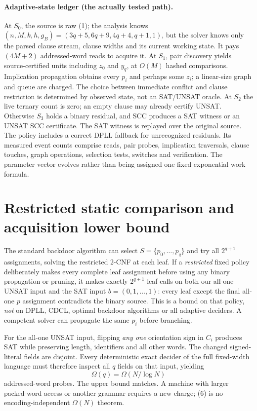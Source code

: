 \documentclass[11pt]{article}
\begin{document}
\paragraph{Adaptive-state ledger (the actually tested path).}
At $S_0$, the source is raw (1); the analysis knows
$(n,M,k,h,g_B)=(3q+5,6q+9,4q+4,q+1,1)$, but the solver knows
only the parsed clause stream, clause widths and its current
working state. It pays $(4M+2)$ addressed-word reads to acquire it.
At $S_1$, pair discovery yields source-certified units including
$z_0$ and $y_q$, at $O(M)$ hashed comparisons. Implication
propagation obtains every $p_i$ and perhaps some $z_i$;
a linear-size graph and queue are charged.
The choice between immediate conflict and clause restriction is
determined by observed state, not an SAT/UNSAT oracle.
At $S_2$ the live ternary count is zero; an empty clause may
already certify UNSAT. Otherwise $S_3$ holds a binary residual,
and SCC produces a SAT witness or an UNSAT SCC certificate.
The SAT witness is replayed over the original source.
The policy includes a correct DPLL fallback for unrecognized
residuals. Its measured event counts comprise reads, pair probes,
implication traversals, clause touches, graph operations, selection
tests, switches and verification. The parameter vector evolves
rather than being assigned one fixed exponential work formula.

\section{Restricted static comparison and acquisition lower bound}
The standard backdoor algorithm can select $S=\{p_0,\ldots,p_q\}$
and try all $2^{q+1}$ assignments, solving the restricted 2-CNF at
each leaf. If a \emph{restricted} fixed policy deliberately makes
every complete leaf assignment before using any binary propagation
or pruning, it makes exactly $2^{q+1}$ leaf calls on both our
all-one UNSAT input and the SAT input $b=(0,1,\ldots,1)$:
every leaf except the final all-one $p$ assignment contradicts
the binary source. This is a bound on that policy, \emph{not}
on DPLL, CDCL, optimal backdoor algorithms or all adaptive deciders.
A competent solver can propagate the same $p_i$ before branching.

For the all-one UNSAT input, flipping \emph{any one} orientation
sign in $C_i$ produces SAT while preserving length, identifiers
and all other words. The changed signed-literal fields are disjoint.
Every deterministic exact decider of the full fixed-width language
must therefore inspect all $q$ fields on that input, yielding
\[
\boxed{\Omega(q)=\Omega(N/\log N)}
\tag{6}
\]
addressed-word probes. The upper bound matches. A machine with
larger packed-word access or another grammar requires a new charge;
(6) is no encoding-independent $\Omega(N)$ theorem.
\end{document}
